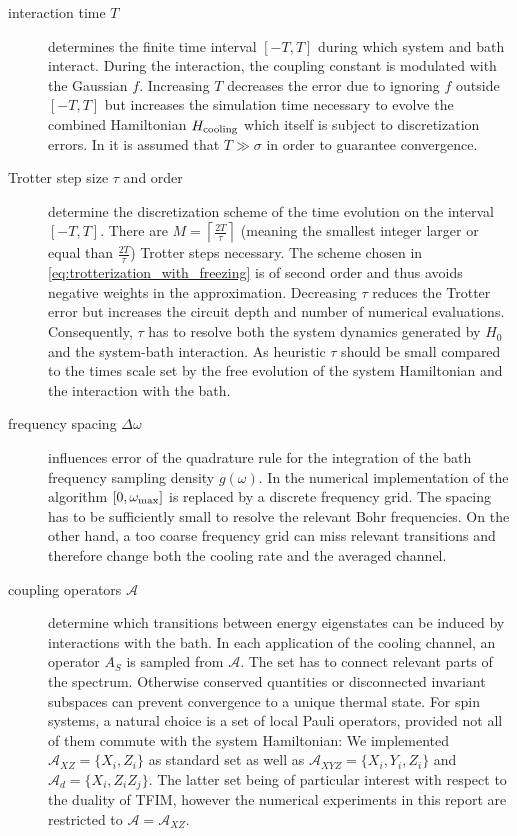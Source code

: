 \documentclass[12pt,a4paper]{article}
\newcommand{\SA}[1]{{\color{orange}{[SA: #1]}}}
\begin{document}
\begin{description}
    
    \item[interaction time $T$] determines the finite time interval $[-T,T]$ during which system and bath interact. During the interaction, the coupling constant is modulated with the Gaussian $f$. Increasing $T$ decreases the error due to ignoring $f$ outside $[-T,T]$ but increases the simulation time necessary to evolve the combined Hamiltonian $H_{\rm cooling}$ which itself is subject to discretization errors. In \citet{ding2025} it is assumed that $T\gg \sigma$ in order to guarantee convergence.

    \item[Trotter step size $\tau$ and order] determine the discretization scheme of the time evolution on the interval $[-T,T]$. There are $ M=\left\lceil\frac{2T}{\tau}\right\rceil $ (meaning the smallest integer larger or equal than $\frac{2T}{\tau}$) %
    Trotter steps necessary. The scheme chosen in \cref{eq:trotterization_with_freezing} is of second order and thus avoids negative weights in the approximation.
    Decreasing $\tau$ reduces the Trotter error but increases the circuit depth and number of numerical evaluations. Consequently, $\tau$ has to resolve both the system dynamics generated by $H_0$ and the system-bath interaction. As heuristic $\tau$ should be small compared to the times scale set by the free evolution of the system Hamiltonian and the interaction with the bath. 

    \item[frequency spacing $\Delta\omega$] influences error of the quadrature rule for the integration of the bath frequency sampling density $g(\omega)$. In the numerical implementation of the algorithm $[0, \omega_{\rm max}]$ is replaced by a discrete frequency grid. The spacing has to be sufficiently small to resolve the relevant Bohr frequencies. On the other hand, a too coarse frequency grid can miss relevant transitions and therefore change both the cooling rate and the averaged channel.

    \item[coupling operators $\mathcal{A}$] determine which transitions between energy eigenstates can be induced by interactions with the bath. In each application of the cooling channel, an operator $A_S$ is sampled from $\mathcal{A}$. The set has to connect relevant parts of the spectrum. Otherwise conserved quantities or disconnected invariant subspaces can prevent convergence to a unique thermal state. For spin systems, a natural choice is a set of local Pauli operators, provided not all of them commute with the system Hamiltonian: We implemented $\mathcal{A}_{XZ}=\{X_i, Z_i\} $ as standard set  as well as  $\mathcal{A}_{XYZ}=\{X_i, Y_i, Z_i\}$ and $\mathcal{A}_{d}=\{X_i, Z_iZ_j\}$. The latter set being of particular interest with respect to the duality of TFIM, however the numerical experiments in this report are restricted to $\mathcal{A}=\mathcal{A}_{XZ}$.
\end{description}
\end{document}
